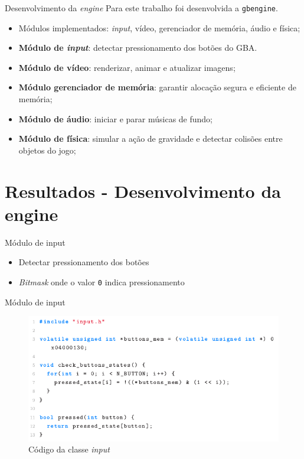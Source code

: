 \documentclass[notes, mathserif]{beamer}
\begin{document}
\begin{frame}{Desenvolvimento da \textit{engine}}
	Para este trabalho foi desenvolvida a \texttt{gbengine}.
	\begin{itemize}[<+->]
		\item M\'odulos implementados: \textit{input}, v\'ideo, gerenciador de mem\'oria, \'audio e f\'isica;
		\item \textbf{M\'odulo de \textit{input}}: detectar pressionamento dos bot\~oes do GBA.
		\item \textbf{M\'odulo de v\'ideo}: renderizar, animar e atualizar imagens;
		\item \textbf{M\'odulo gerenciador de mem\'oria}: garantir aloca\c c\~ao segura e eficiente de mem\'oria;
		\item \textbf{M\'odulo de \'audio}: iniciar e parar m\'usicas de fundo;
		\item \textbf{M\'odulo de f\'isica}: simular a a\c c\~ao de gravidade e detectar colis\~oes entre objetos do jogo;
	\end{itemize}
\end{frame}

\section{Resultados - Desenvolvimento da engine}

\begin{frame}{M\'odulo de input}
	\begin{itemize}
		\item Detectar pressionamento dos bot\~oes
		\item \textit{Bitmask} onde o valor \texttt{0} indica pressionamento
	\end{itemize}
\end{frame}

\begin{frame}{M\'odulo de input}
	\begin{figure}[H]
		\includegraphics[width=1\linewidth]{figuras/input-codigo.png}
		\centering
		\caption{C\'odigo da classe \textit{input}}
		\label{fig:inputcode}
	\end{figure}
\end{frame}
\end{document}
